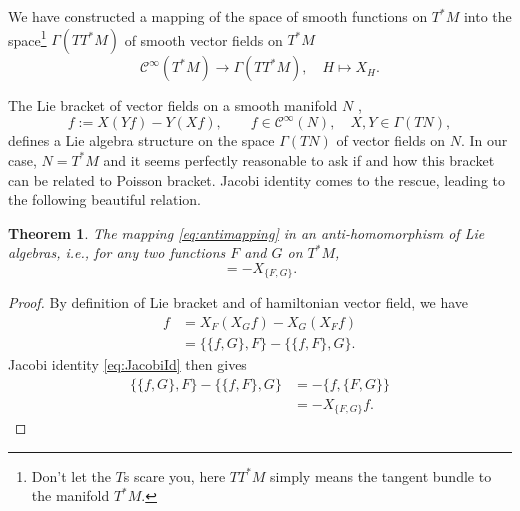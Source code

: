 \documentclass[english,fontsize=11pt,paper=b5]{scrbook}
\newtheorem{theorem}{Theorem}[chapter]
\theoremstyle{definition}
\begin{document}
    We have constructed a mapping of the space of smooth functions on $T^*M$ into the space\footnote{Don't let the $T$s scare you, here $TT^*M$ simply means the tangent bundle to the manifold $T^*M$.} ${\Gamma(TT^* M)}$ of smooth vector fields on $T^*M$
    \begin{equation}\label{eq:antimapping}
      \mathcal{C}^\infty (T^*M) \to \Gamma(TT^* M), \quad H \mapsto X_H.
    \end{equation}

    The Lie bracket of vector fields on a smooth manifold $N$ \cite{book:lee},
    \begin{equation}
      [X,Y] f := X(Y f) - Y(X f), \qquad f\in\mathcal{C}^\infty(N), \quad X,Y\in\Gamma(TN),
    \end{equation}
    defines a Lie algebra structure on the space $\Gamma(TN)$ of vector fields on $N$.
    In our case, $N = T^* M$ and it seems perfectly reasonable to ask if and how this bracket can be related to Poisson bracket.
    Jacobi identity comes to the rescue, leading to the following beautiful relation.

    \begin{theorem}\label{thm:antihom}
      The mapping \eqref{eq:antimapping} in an \emph{anti-homomorphism} of Lie algebras, i.e., for any two functions $F$ and $G$ on $T^*M$,
      \begin{equation}
        [X_{F}, X_{G}] = - X_{\big\{F, G\big\}}.
      \end{equation}
    \end{theorem}
    \begin{proof}
      By definition of Lie bracket and of hamiltonian vector field, we have
      \begin{align}
        [X_{F}, X_{G}] f & = X_{F}(X_{G} f) - X_{G}(X_{F} f)                                    \\
                         & = \big\{\big\{f, G\big\}, F\big\} - \big\{\big\{f, F\big\}, G\big\}.
      \end{align}
      Jacobi identity \eqref{eq:JacobiId} then gives
      \begin{align}
        \big\{\big\{f, G\big\}, F\big\} - \big\{\big\{f, F\big\}, G\big\} & = - \big\{f,\big\{F,G\big\}\big\} \\
                                                                          & = - X_{\big\{F, G\big\}} f.
      \end{align}
    \end{proof}
\end{document}
